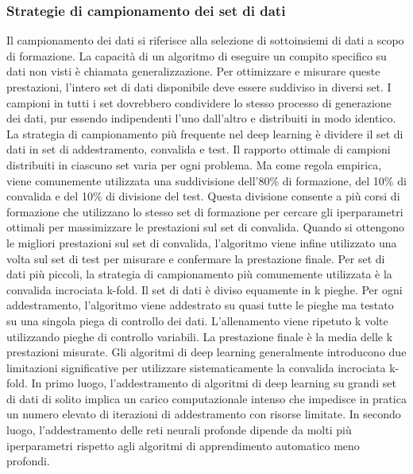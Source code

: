 \documentclass[12pt,a4paper]{report}
\begin{document}
\subsubsection{Strategie di campionamento dei set di dati}
Il campionamento dei dati si riferisce alla selezione di sottoinsiemi di dati a scopo di formazione. La capacità di un algoritmo di eseguire un compito specifico su dati non visti è chiamata generalizzazione. Per ottimizzare e misurare queste prestazioni, l'intero set di dati disponibile deve essere suddiviso in diversi set. I campioni in tutti i set dovrebbero condividere lo stesso processo di generazione dei dati, pur essendo indipendenti l'uno dall'altro e distribuiti in modo identico.
La strategia di campionamento più frequente nel deep learning è dividere il set di dati in set di addestramento, convalida e test.
Il rapporto ottimale di campioni distribuiti in ciascuno set varia per ogni problema. Ma come regola empirica, viene comunemente utilizzata una suddivisione dell'80\% di formazione, del 10\% di convalida e del 10\% di divisione del test. Questa divisione consente a più corsi di formazione che utilizzano lo stesso set di formazione per cercare gli iperparametri ottimali per massimizzare le prestazioni sul set di convalida. Quando si ottengono le migliori prestazioni sul set di convalida, l'algoritmo viene infine utilizzato una volta sul set di test per misurare e confermare la prestazione finale.
Per set di dati più piccoli, la strategia di campionamento più comunemente utilizzata è la convalida incrociata k-fold. Il set di dati è diviso equamente in k pieghe. Per ogni addestramento, l'algoritmo viene addestrato su quasi tutte le pieghe ma testato su una singola piega di controllo dei dati. L'allenamento viene ripetuto k volte utilizzando pieghe di controllo variabili. La prestazione finale è la media delle k prestazioni misurate.
Gli algoritmi di deep learning generalmente introducono due limitazioni significative per utilizzare sistematicamente la convalida incrociata k-fold. In primo luogo, l'addestramento di algoritmi di deep learning su grandi set di dati di solito implica un carico computazionale intenso che impedisce in pratica un numero elevato di iterazioni di addestramento con risorse limitate. In secondo luogo, l'addestramento delle reti neurali profonde dipende da molti più iperparametri rispetto agli algoritmi di apprendimento automatico meno profondi.\\
\end{document}
